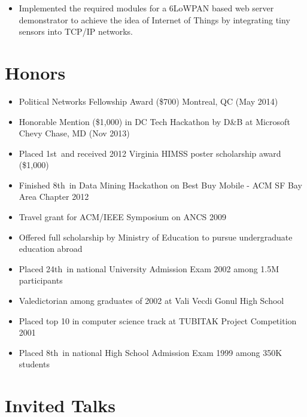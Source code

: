 \documentclass[11pt, letter]{article}
\begin{document}
\begin{raggedright}
\begin{itemize}
\itemsep1pt\parskip0pt
\item
  Implemented the required modules for a 6LoWPAN based web server
  demonstrator to achieve the idea of Internet of Things by integrating
  tiny sensors into TCP/IP networks.
\end{itemize}

\section{Honors}\label{honors}

\begin{itemize}
\itemsep1pt\parskip0pt
\item
  Political Networks Fellowship Award (\$700) Montreal, QC (May 2014)
\item
  Honorable Mention (\$1,000) in DC Tech Hackathon by D\&B at Microsoft
  Chevy Chase, MD (Nov 2013)
\item
  Placed 1st~and received 2012 Virginia HIMSS poster scholarship award
  (\$1,000)
\item
  Finished 8th~in Data Mining Hackathon on Best Buy Mobile - ACM SF Bay
  Area Chapter 2012
\item
  Travel grant for ACM/IEEE Symposium on ANCS 2009
\item
  Offered full scholarship by Ministry of Education to pursue
  undergraduate education abroad
\item
  Placed 24th~in national University Admission Exam 2002 among 1.5M
  participants
\item
  Valedictorian among graduates of 2002 at Vali Vecdi Gonul High School
\item
  Placed top 10 in computer science track at TUBITAK Project Competition
  2001
\item
  Placed 8th~in national High School Admission Exam 1999 among 350K
  students
\end{itemize}

\section{Invited Talks}\label{invited-talks}


\end{raggedright}
\end{document}
